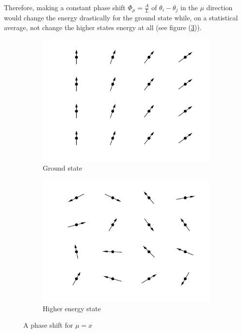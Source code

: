 Therefore, making a constant phase shift $\Phi_\mu = \frac{A}{L}$ of $\theta_i - \theta_j$ in the $\mu$ direction would change the energy drastically for the ground state while, on a statistical average, not change the higher states energy at all (see figure (\ref{fig:xyphaseshift})).

\begin{figure}[h!]
\centering
    \begin{subfigure}{.4\textwidth}
        \centering
        \includegraphics[width=\linewidth]{figures/phaseShiftXaxis.png}
        \caption{Ground state}
        \label{fig:xyground}
    \end{subfigure}%
    \begin{subfigure}{.4\textwidth}
        \centering
        \includegraphics[width=\linewidth]{figures/randomPhaseShift.png}
        \caption{Higher energy state}
        \label{fig:xyhigher}
    \end{subfigure}
    \caption{A phase shift for $\mu = x$}
\label{fig:xyphaseshift}
\end{figure}

